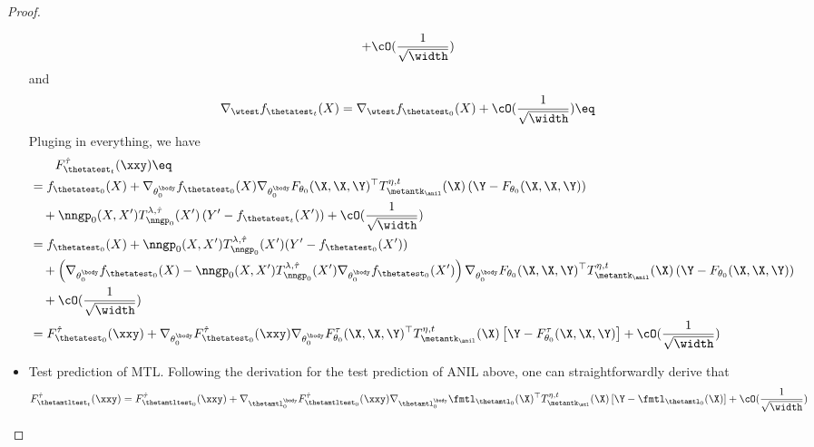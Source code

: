 \documentclass{article}
\begin{document}
\begin{proof}
\begin{itemize}
\begin{align*}
        + \cO(\frac{1}{\sqrt{\width}}) 
    \end{align*}
    and 
    \begin{align*}
        \nabla_{\wtest} f_{\thetatest_t}(X) 
        = \nabla_{\wtest} f_{\thetatest_0}(X) + \cO(\frac{1}{\sqrt{\width}}) \eq
    \end{align*}
    Pluging in everything, we have
    \begin{align*}
        &\qquad F^{\hat\tau}_{\thetatest_t} (\xxy) \eq\\
        &= f_{\thetatest_0}(X) +\nabla_{\theta_0^\body} f_{\thetatest_0}(X)  \nabla_{\theta_0^\body} F_{\theta_0}(\X,\X,\Y)^\top T^{\eta,t}_{\metantk_\anil}(\X) \left(\Y - F_{\theta_0}(\X,\X,\Y)\right) \\
        &\quad +\nngp_0(X,X') T^{\lambda,\hat\tau}_{\nngp_0}(X')\left ( Y' -  f_{\thetatest_t}(X')\right) + \cO(\frac{1}{\sqrt{\width}})\\
        &= f_{\thetatest_0}(X) + \nngp_0(X,X') T^{\lambda,\hat\tau}_{\nngp_0}(X')(Y'- f_{\thetatest_0}(X')) \\
        &\quad + \left(\nabla_{\theta_0^\body} f_{\thetatest_0}(X)  - \nngp_0(X,X') T^{\lambda,\hat\tau}_{\nngp_0}(X')\nabla_{\theta_0^\body} f_{\thetatest_0}(X')\right)  \nabla_{\theta_0^\body} F_{\theta_0}(\X,\X,\Y)^\top T^{\eta,t}_{\metantk_\anil}(\X) \left(\Y - F_{\theta_0}(\X,\X,\Y)\right) \\
        &\quad +  \cO(\frac{1}{\sqrt{\width}})\\
        &= F^{\hat\tau}_{\thetatest_0}(\xxy) + \nabla_{\theta_0^\body} F^{\hat \tau}_{\thetatest_0} (\xxy) \nabla_{\theta_0^\body} F^{\tau}_{\theta_0} (\X,\X,\Y)^\top  T^{\eta,t}_{\metantk_\anil}(\X) \left[\Y - F^\tau_{\theta_0}(\X,\X,\Y)\right] + \cO(\frac{1}{\sqrt{\width}})
    \end{align*}
    \item Test prediction of MTL. Following the derivation for the test prediction of ANIL above, one can straightforwardly derive that 
    \begin{align*}
    F^{\hat\tau}_{\thetamtltest_t}(\xxy) = F^{\hat\tau}_{\thetamtltest_0}(\xxy) +\nabla_{\thetamtl_0^\body} F^{\hat \tau}_{\thetamtltest_0} (\xxy) \nabla_{\thetamtl_0^\body} \fmtl_{\thetamtl_0}(\X)^\top T^{\eta,t}_{\metantk_\mtl}(\X) \left[\Y - \fmtl_{\thetamtl_0}(\X)\right] + \cO(\frac{1}{\sqrt{\width}})
    \end{align*}
\end{itemize}
\end{proof}
\end{document}
